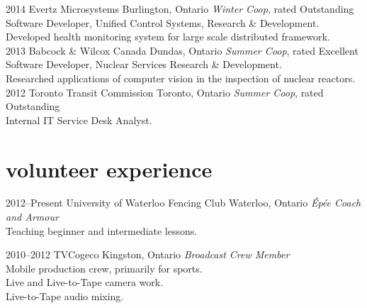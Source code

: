\documentclass[]{friggeri-cv} %
\begin{document}
\begin{entrylist}

\entry
{2014}
{Evertz Microsystems}
{Burlington, Ontario}
{\emph{Winter Co\-op}, rated Outstanding \\
Software Developer, Unified Control Systems, Research \& Development. \\
Developed health monitoring system for large scale distributed framework. \\}
\entry
{2013}
{Babcock \& Wilcox Canada}
{Dundas, Ontario}
{\emph{Summer Co\-op}, rated Excellent \\
Software Developer, Nuclear Services Research \& Development. \\
Researched applications of computer vision in the inspection of nuclear reactors. \\}
\entry
{2012}
{Toronto Transit Commission}
{Toronto, Ontario}
{\emph{Summer Co\-op}, rated Outstanding \\
Internal IT Service Desk Analyst.}

\end{entrylist}

\section{volunteer experience}

\begin{entrylist}

\entry
{2012--Present}
{University of Waterloo Fencing Club}
{Waterloo, Ontario}
{\emph{\'{E}p\'{e}e Coach and Armour} \\
Teaching beginner and intermediate lessons. \\}

\entry
{2010--2012}
{TVCogeco}
{Kingston, Ontario}
{\emph{Broadcast Crew Member} \\
Mobile production crew, primarily for sports. \\
Live and Live-to-Tape camera work. \\
Live-to-Tape audio mixing.}
\end{entrylist}
\end{document}
